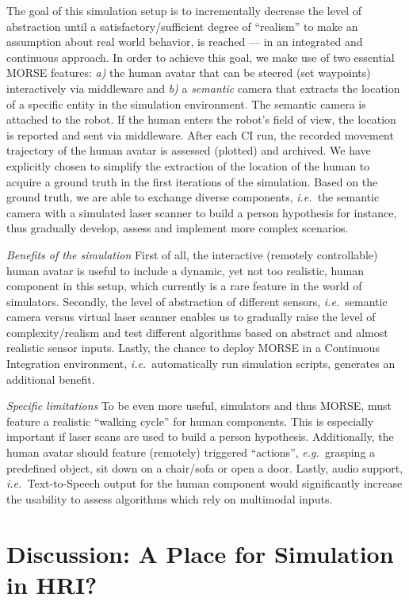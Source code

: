 \documentclass[letterpaper, 10pt, conference]{ieeeconf}
\newcommand{\eg}{{\textit{e.g.~}}}
\newcommand{\ie}{{\textit{i.e.~}}}
\begin{document}
The goal of this simulation setup is to incrementally decrease the level of
abstraction until a satisfactory/sufficient degree of ``realism'' to make an
assumption about real world behavior, is reached --- in an integrated and
continuous approach. In order to achieve this goal, we make use of two essential
MORSE features: \textit{a)} the human avatar that can be steered (set waypoints)
interactively via middleware and \textit{b)} a \emph{semantic} camera that
extracts the location of a specific entity in the simulation environment.  The
semantic camera is attached to the robot. If the human enters the robot's field
of view, the location is reported and sent via middleware. After each CI run,
the recorded movement trajectory of the human avatar is assessed (plotted) and
archived. We have explicitly chosen to simplify the extraction of the location
of the human to acquire a ground truth in the first iterations of the
simulation. Based on the ground truth, we are able to exchange diverse
components, \ie the semantic camera with a simulated laser scanner to build a
person hypothesis for instance, thus gradually develop, assess and implement
more complex scenarios. 

\emph{Benefits of the simulation} First of all, the interactive (remotely
controllable) human avatar is useful to include a dynamic, yet not too
realistic, human component in this setup, which currently is a rare feature in
the world of simulators. Secondly, the level of abstraction of different
sensors, \ie semantic camera versus virtual laser scanner enables us to
gradually raise the level of complexity/realism and test different algorithms
based on abstract and almost realistic sensor inputs.  Lastly, the chance to
deploy MORSE in a Continuous Integration environment, \ie automatically run
simulation scripts, generates an additional benefit.
 
\emph{Specific limitations} To be even more useful, simulators and thus MORSE, must
feature a realistic ``walking cycle'' for human components. This is especially
important if laser scans are used to build a person hypothesis. Additionally, the
human avatar should feature (remotely) triggered ``actions'', \eg grasping a 
predefined object, sit down on a chair/sofa or open a door. Lastly, audio support, 
\ie Text-to-Speech output for the human component would significantly increase
the usability to assess algorithms which rely on multimodal inputs.  

\section{Discussion: A Place for Simulation in HRI?}
\end{document}
